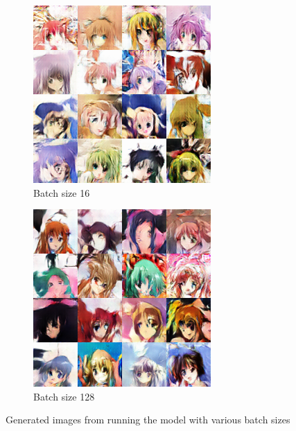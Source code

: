 \documentclass{article} %
\begin{document}
\begin{figure}[h!]
	\centering
	\begin{subfigure}[b]{0.24\linewidth}
		\includegraphics[width=\linewidth]{ijovasev-12-batch-size-16-gen.png}
		\caption{Batch size 16}
		\label{fig:kerasBatch16Gen}
	\end{subfigure}
	\begin{subfigure}[b]{0.24\linewidth}
		\includegraphics[width=\linewidth]{ijovasev-13-batch-size-128-gen.png}
		\caption{Batch size 128}
		\label{fig:kerasBatch128Gen}
	\end{subfigure}
	\caption{Generated images from running the model with various batch sizes}
	\label{fig:kerasBatchGen}
\end{figure}
\end{document}
